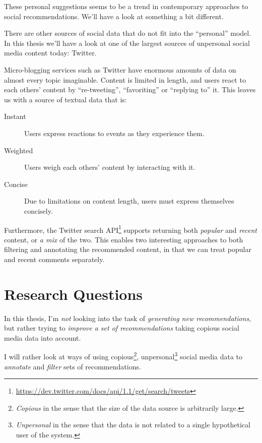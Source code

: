 These personal suggestions seems to be a trend in contemporary approaches to social recommendations.
We'll have a look at something a bit different.


There are other sources of social data that do not fit into the ``personal'' model.
In this thesis we'll have a look at one of the largest sources of unpersonal social media content today: Twitter.

Micro-blogging services such as Twitter have enormous amounts of data on almost every topic imaginable.
Content is limited in length, and users react to each others' content by ``re-tweeting'', ``favoriting'' or ``replying to'' it.
This leaves us with a source of textual data that is:

\begin{description}
  \item[Instant] Users express reactions to events as they experience them.
  \item[Weighted] Users weigh each others' content by interacting with it.
  \item[Concise] Due to limitations on content length, users must express themselves concisely.
\end{description}

Furthermore, the Twitter search API\footnote{\url{https://dev.twitter.com/docs/api/1.1/get/search/tweets}} supports returning both \emph{popular} and \emph{recent} content, or \emph{a mix} of the two.
This enables two interesting approaches to both filtering and annotating the recommended content, in that we can treat popular and recent comments separately.


\section{Research Questions}

In this thesis, I'm \emph{not} looking into the task of \emph{generating new recommendations}, but rather trying to \emph{improve a set of recommendations} taking copious social media data into account.

I will rather look at ways of using copious\footnote{\emph{Copious} in the sense that the size of the data source is arbitrarily large.}, unpersonal\footnote{\emph{Unpersonal} in the sense that the data is not related to a single hypothetical user of the system.} social media data to \emph{annotate} and \emph{filter} sets of recommendations.

